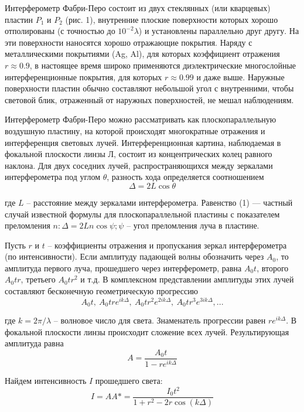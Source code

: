 \documentclass[14pt]{article}
\begin{document}
Интерферометр Фабри-Перо состоит из двух стеклянных (или кварцевых)
пластин $P_1$ и $P_2$ (рис. 1), внутренние плоские поверхности которых
хорошо отполированы (с точностью до $10^{-2}\lambda$) и установлены параллельно
друг другу. На эти поверхности наносятся хорошо отражающие покрытия.
Наряду с металлическими покрытиями (Ag, Al), для которых
коэффициент отражения $r \approx 0.9$, в настоящее время широко применяются
диэлектрические многослойные интерференционные покрытия, для
которых $r \approx 0.99$ и даже выше. Наружные поверхности пластин обычно
составляют небольшой угол с внутренними, чтобы световой блик, отраженный
от наружных поверхностей, не мешал наблюдениям.

Интерферометр Фабри-Перо можно рассматривать как плоскопараллельную
воздушную пластину, на которой происходят многократные
отражения и интерференция световых лучей. Интерференционная
картина, наблюдаемая в фокальной плоскости линзы Л, состоит из концентрических
колец равного наклона. Для двух соседних лучей, распространяющихся
между зеркалами интерферометра под углом $\theta$, разность
хода определяется соотношением
\begin{equation}
	\Delta = 2L\cos\theta
\end{equation}

\noindent где $L$ -- расстояние между зеркалами интерферометра. Равенство (1) —
частный случай известной формулы для плоскопараллельной пластины с показателем преломления
$n: \Delta = 2Ln\cos\psi; \psi$ -- угол преломления луча в пластине.

Пусть $r$ и $t$ -- коэффициенты отражения и пропускания зеркал интерферометра
(по интенсивности). Если амплитуду падающей волны обозначить через
$A_0$, то амплитуда первого луча, прошедшего через интерферометр, равна
$A_0t$, второго $A_0tr$, третьего $A_0tr^2$ и т.д. В комплексном
представлении амплитуды этих лучей составляют бесконечную геометрическую
прогрессию
\begin{equation}
	A_0t,~A_0tre^{ik\Delta},~A_0tr^2e^{2ik\Delta},~A_0tr^3e^{3ik\Delta}, ...
\end{equation}

\noindent где $k = 2\pi/\lambda$ -- волновое число для света. Знаменатель прогрессии равен
$re^{ik\Delta}$. В фокальной плоскости линзы происходит сложение всех лучей.
Результирующая амплитуда равна
\begin{equation}
	A = \frac{A_0t}{1 - re^{ik\Delta}}
\end{equation}

\noindent Найдем интенсивность $I$ прошедшего света:
\begin{equation}
	I = AA* = \frac{I_0t^2}{1 + r^2 - 2r\cos(k\Delta)}
\end{equation}
\end{document}
